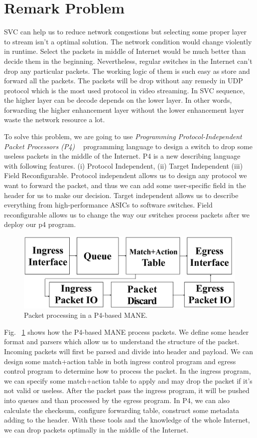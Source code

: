 \section{Remark Problem} \label{sec:Remark Problem}

SVC can help us to reduce network congestions but selecting some proper layer to stream isn't a optimal solution. The network condition would change violently in runtime. Select the packets in middle of Internet would be much better than decide them in the beginning. Nevertheless, regular switches in the Internet can't drop any particular packets. The working logic of them is such easy as store and forward all the packets. The packets will be drop without any remedy in UDP protocol which is the most used protocol in video streaming. In SVC sequence, the higher layer can be decode depends on the lower layer. In other words, forwarding the higher enhancement layer without the lower enhancement layer waste the network resource a lot. 

To solve this problem, we are going to use {\em Programming Protocol-Independent Packet Processors (P4) ~\cite{BDGI+14}} programming language to design a switch to drop some useless packets in the middle of the Internet. P4 is a new describing language with following features. (i) Protocol Independent, (ii) Target Independent (iii) Field Reconfigurable. Protocol independent allows us to design any protocol we want to forward the packet, and thus we can add some user-specific field in the header for us to make our decision. Target independent allows us to describe everything from high-performance ASICs to software switches. Field reconfigurable allows us to change the way our switches process packets after we deploy our p4 program. 

\begin{figure}[tbh]
    \centering
    \includegraphics[width=.24\textwidth]{fig/MANE_1.eps}
    \caption{Packet processing in a P4-based MANE.}
    \label{MANE}
\end{figure}

Fig. ~\ref{MANE} shows how the P4-based MANE process packets. We define some header format and parsers which allow us to understand the structure of the packet. Incoming packets will first be parsed and divide into header and payload. We can design some match+action table in both ingress control program and egress control program to determine how to process the packet. In the ingress program, we can specify some match+action table to apply and may drop the packet if it's not valid or useless. After the packet pass the ingress program, it will be pushed into queues and than processed by the egress program. In P4, we can also calculate the checksum, configure forwarding table, construct some metadata adding to the header. With these tools and the knowledge of the whole Internet,  we can drop packets optimally in the middle of the Internet. 

